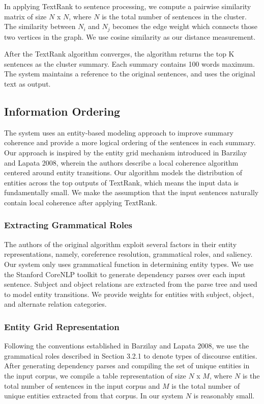 \documentclass[11pt]{article}
\begin{document}
	In applying TextRank to sentence processing, we compute a pairwise similarity matrix of size $N$ x $N$, where $N$ is the total number of sentences in the cluster. The similarity between $N_i$ and $N_j$ becomes the edge weight which connects those two vertices in the graph. We use cosine similarity as our distance measurement.
	
	After the TextRank algorithm converges, the algorithm returns the top K sentences as the cluster summary. Each summary contains 100 words maximum. The system maintains a 
	reference to the original sentences, and uses the original text as output.
	
	\subsection{Information Ordering}
	The system uses an entity-based modeling approach to improve summary coherence and provide a more logical ordering of the sentences in each summary. Our approach is inspired by the entity grid mechanism introduced in Barzilay and Lapata 2008, wherein the authors describe a local coherence algorithm centered around entity transitions. Our algorithm models the distribution of entities across the top outputs of TextRank, which means the input data is fundamentally small. We make the assumption that the input sentences naturally contain local coherence after applying TextRank. 
	
	\subsubsection{Extracting Grammatical Roles}
	The authors of the original algorithm exploit several factors in their entity representations, namely, coreference resolution, grammatical roles, and saliency. Our system only uses grammatical function in determining entity types. We use the Stanford CoreNLP toolkit to generate dependency parses over each input sentence. Subject and object relations are extracted from the parse tree and used to model entity transitions. We provide weights for entities with subject, object, and alternate relation categories.
	
	\subsubsection{Entity Grid Representation}
	Following the conventions established in Barzilay and Lapata 2008, we use the grammatical roles described in Section 3.2.1 to denote types of discourse entities. After generating dependency parses and compiling the set of unique entities in the input corpus, we compile a table representation of size $N$ x $M$, where $N$ is the total number of sentences in the input corpus and $M$ is the total number of unique entities extracted from that corpus. In our system $N$ is reasonably small.
	
\end{document}
